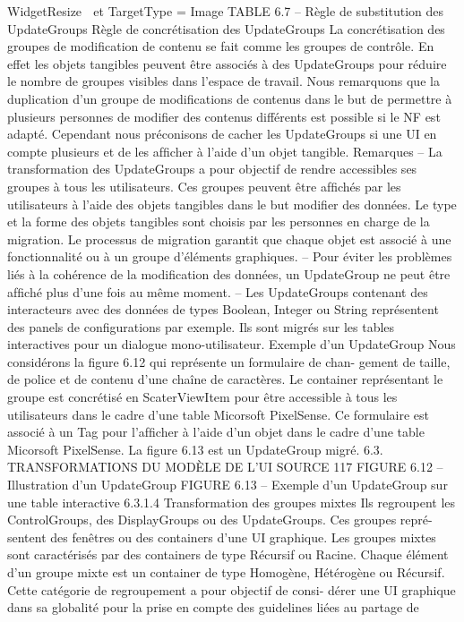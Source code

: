 \documentclass{article}
\begin{document}
WidgetResize

et TargetType = {Image}
TABLE 6.7 – Règle de substitution des UpdateGroups
Règle de concrétisation des UpdateGroups
La concrétisation des groupes de modiﬁcation de
contenu se fait comme les groupes de contrôle. En effet les objets tangibles peuvent être associés
à des UpdateGroups pour réduire le nombre de groupes visibles dans l’espace de travail.
Nous remarquons que la duplication d’un groupe de modiﬁcations de contenus dans le but de
permettre à plusieurs personnes de modiﬁer des contenus différents est possible si le NF est adapté.
Cependant nous préconisons de cacher les UpdateGroups si une UI en compte plusieurs et de les
afﬁcher à l’aide d’un objet tangible.
Remarques
– La transformation des UpdateGroups a pour objectif de rendre accessibles ses groupes à tous
les utilisateurs. Ces groupes peuvent être afﬁchés par les utilisateurs à l’aide des objets tangibles
dans le but modiﬁer des données. Le type et la forme des objets tangibles sont choisis par les
personnes en charge de la migration. Le processus de migration garantit que chaque objet est
associé à une fonctionnalité ou à un groupe d’éléments graphiques.
– Pour éviter les problèmes liés à la cohérence de la modiﬁcation des données, un UpdateGroup
ne peut être afﬁché plus d’une fois au même moment.
– Les UpdateGroups contenant des interacteurs avec des données de types Boolean, Integer ou
String représentent des panels de conﬁgurations par exemple. Ils sont migrés sur les tables
interactives pour un dialogue mono-utilisateur.
Exemple d’un UpdateGroup
Nous considérons la ﬁgure 6.12 qui représente un formulaire de chan-
gement de taille, de police et de contenu d’une chaîne de caractères. Le container représentant le
groupe est concrétisé en ScaterViewItem pour être accessible à tous les utilisateurs dans le cadre
d’une table Micorsoft PixelSense. Ce formulaire est associé à un Tag pour l’afﬁcher à l’aide d’un
objet dans le cadre d’une table Micorsoft PixelSense. La ﬁgure 6.13 est un UpdateGroup migré.
6.3. TRANSFORMATIONS DU MODÈLE DE L’UI SOURCE
117
FIGURE 6.12 – Illustration d’un UpdateGroup
FIGURE 6.13 – Exemple d’un UpdateGroup sur une table interactive
6.3.1.4
Transformation des groupes mixtes
Ils regroupent les ControlGroups, des DisplayGroups ou des UpdateGroups. Ces groupes repré-
sentent des fenêtres ou des containers d’une UI graphique. Les groupes mixtes sont caractérisés par
des containers de type Récursif ou Racine. Chaque élément d’un groupe mixte est un container de
type Homogène, Hétérogène ou Récursif. Cette catégorie de regroupement a pour objectif de consi-
dérer une UI graphique dans sa globalité pour la prise en compte des guidelines liées au partage de
\end{document}
